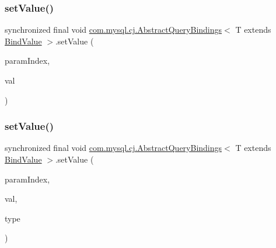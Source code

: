 \mbox{\label{classcom_1_1mysql_1_1cj_1_1_abstract_query_bindings_a43058029a8ced3bde792ae2c9c107fff}} 
\subsubsection{\texorpdfstring{set\+Value()}{setValue()}\hspace{0.1cm}{\footnotesize\ttfamily [3/4]}}
{\footnotesize\ttfamily synchronized final void \mbox{\hyperlink{classcom_1_1mysql_1_1cj_1_1_abstract_query_bindings}{com.\+mysql.\+cj.\+Abstract\+Query\+Bindings}}$<$ T extends \mbox{\hyperlink{interfacecom_1_1mysql_1_1cj_1_1_bind_value}{Bind\+Value}} $>$.set\+Value (\begin{DoxyParamCaption}\item[{int}]{param\+Index,  }\item[{String}]{val }\end{DoxyParamCaption})}

\mbox{\label{classcom_1_1mysql_1_1cj_1_1_abstract_query_bindings_a2c33843c7f8093c1a56583fa57510456}} 
\subsubsection{\texorpdfstring{set\+Value()}{setValue()}\hspace{0.1cm}{\footnotesize\ttfamily [4/4]}}
{\footnotesize\ttfamily synchronized final void \mbox{\hyperlink{classcom_1_1mysql_1_1cj_1_1_abstract_query_bindings}{com.\+mysql.\+cj.\+Abstract\+Query\+Bindings}}$<$ T extends \mbox{\hyperlink{interfacecom_1_1mysql_1_1cj_1_1_bind_value}{Bind\+Value}} $>$.set\+Value (\begin{DoxyParamCaption}\item[{int}]{param\+Index,  }\item[{String}]{val,  }\item[{\mbox{\hyperlink{enumcom_1_1mysql_1_1cj_1_1_mysql_type}{Mysql\+Type}}}]{type }\end{DoxyParamCaption})}



